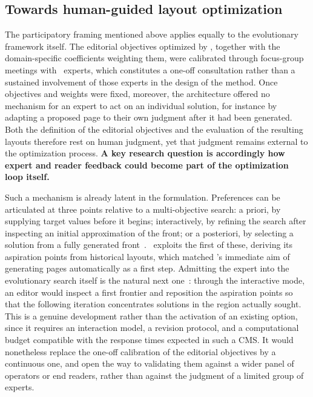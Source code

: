 \subsection{Towards human-guided layout optimization}
\label{sec:perspectives-human-guided}

The participatory framing mentioned above applies equally to the evolutionary framework itself. The editorial objectives optimized by \methodNameGeneral, together with the domain-specific coefficients weighting them, were calibrated through focus-group meetings with \melody\ experts, which constitutes a one-off consultation rather than a sustained involvement of those experts in the design of the method. Once objectives and weights were fixed, moreover, the architecture offered no mechanism for an expert to act on an individual solution, for instance by adapting a proposed page to their own judgment after it had been generated. Both the definition of the editorial objectives and the evaluation of the resulting layouts therefore rest on human judgment, yet that judgment remains external to the optimization process. \textbf{A key research question is accordingly how expert and reader feedback could become part of the optimization loop itself.}

Such a mechanism is already latent in the formulation. Preferences can be articulated at three points relative to a multi-objective search: a priori, by supplying target values before it begins; interactively, by refining the search after inspecting an initial approximation of the front; or a posteriori, by selecting a solution from a fully generated front~\cite{rnsga-iii}. \methodName\ exploits the first of these, deriving its aspiration points from historical layouts, which matched \melody's immediate aim of generating pages automatically as a first step. Admitting the expert into the evolutionary search itself is the natural next one~\cite{takagi-iec-2001, afsar-interactive-moo-2021}: through the interactive mode, an editor would inspect a first frontier and reposition the aspiration points so that the following iteration concentrates solutions in the region actually sought. This is a genuine development rather than the activation of an existing option, since it requires an interaction model, a revision protocol, and a computational budget compatible with the response times expected in such a CMS. It would nonetheless replace the one-off calibration of the editorial objectives by a continuous one, and open the way to validating them against a wider panel of operators or end readers, rather than against the judgment of a limited group of experts.

